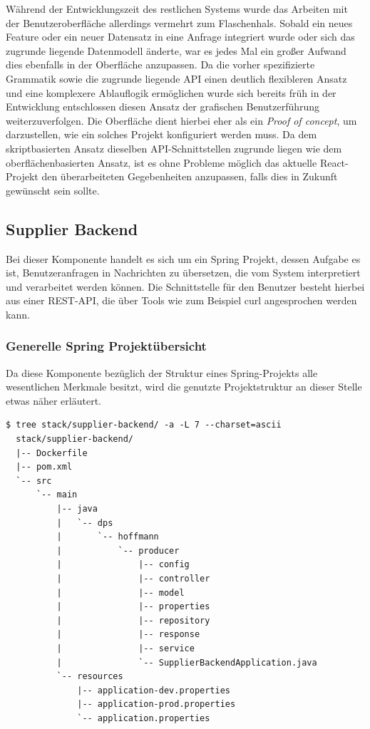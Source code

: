 Während der Entwicklungszeit des restlichen Systems wurde das Arbeiten mit der Benutzeroberfläche allerdings vermehrt zum Flaschenhals. Sobald ein neues Feature oder ein neuer Datensatz in eine Anfrage integriert wurde oder sich das zugrunde liegende Datenmodell änderte, war es jedes Mal ein großer Aufwand dies ebenfalls in der Oberfläche anzupassen. Da die vorher spezifizierte Grammatik sowie die zugrunde liegende API einen deutlich flexibleren Ansatz und eine komplexere Ablauflogik ermöglichen wurde sich bereits früh in der Entwicklung entschlossen diesen Ansatz der grafischen Benutzerführung weiterzuverfolgen. Die Oberfläche dient hierbei eher als ein \emph{Proof of concept}, um darzustellen, wie ein solches Projekt konfiguriert werden muss. Da dem skriptbasierten Ansatz dieselben API-Schnittstellen zugrunde liegen wie dem oberflächenbasierten Ansatz, ist es ohne Probleme möglich das aktuelle React-Projekt den überarbeiteten Gegebenheiten anzupassen, falls dies in Zukunft gewünscht sein sollte.


\subsection{Supplier Backend}
Bei dieser Komponente handelt es sich um ein Spring Projekt, dessen Aufgabe es ist, Benutzeranfragen in Nachrichten zu übersetzen, die vom System interpretiert und verarbeitet werden können. Die Schnittstelle für den Benutzer besteht hierbei aus einer REST-API, die über Tools wie zum Beispiel curl angesprochen werden kann.

\subsubsection{Generelle Spring Projektübersicht}
\label{ss:springProj}
Da diese Komponente bezüglich der Struktur eines Spring-Projekts alle wesentlichen Merkmale besitzt, wird die genutzte Projektstruktur an dieser Stelle etwas näher erläutert. 

\label{verb:supplierStruct}
\begin{minipage}{\linewidth}
\begin{lstlisting}[caption={Supplier Backend - Struktur},style=bashStyle]
  $ tree stack/supplier-backend/ -a -L 7 --charset=ascii
  stack/supplier-backend/
  |-- Dockerfile
  |-- pom.xml
  `-- src
      `-- main
          |-- java
          |   `-- dps
          |       `-- hoffmann
          |           `-- producer
          |               |-- config
          |               |-- controller
          |               |-- model
          |               |-- properties
          |               |-- repository
          |               |-- response
          |               |-- service
          |               `-- SupplierBackendApplication.java
          `-- resources
              |-- application-dev.properties
              |-- application-prod.properties
              `-- application.properties
\end{lstlisting}
\end{minipage}

